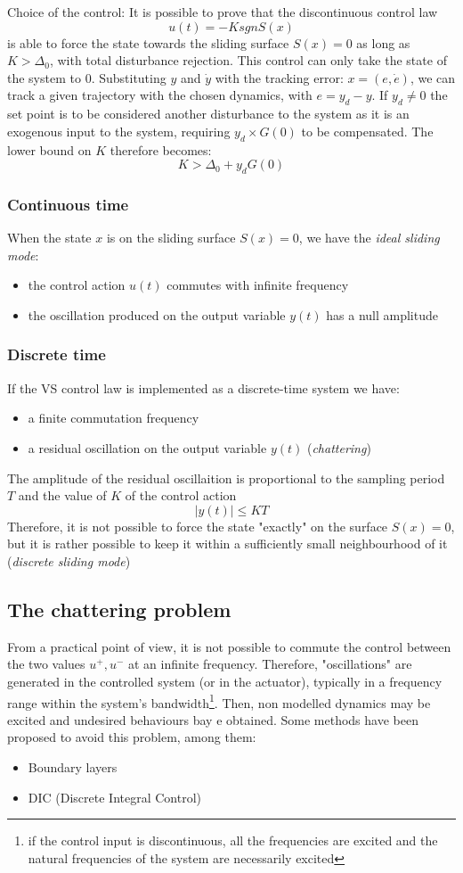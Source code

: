 \documentclass{book}
\begin{document}
Choice of the control: It is possible to prove that the discontinuous control law
\[
    u(t) = -K sgn S(x)
\]
is able to force the state towards the sliding surface $S(x)=0$ as long as $K>\Delta_0$, with total disturbance rejection. This control can only take the state of the system to 0. Substituting $y$ and $\dot{y}$ with the tracking error: $x=(e,\dot{e})$, we can track a given trajectory with the chosen dynamics, with $e=y_d-y$. If $y_d\neq 0 $ the set point is to be considered another disturbance to the system as it is an exogenous input to the system, requiring $y_d \times G(0)$ to be compensated. The lower bound on $K$ therefore becomes:
\[
    K>\Delta_0+y_dG(0)
\]

\subsubsection{Continuous time}
When the state $x$ is on the sliding surface $S(x)=0$, we have the \emph{ideal sliding mode}: 
\begin{itemize}
    \item the control action $u(t)$ commutes with infinite frequency
    \item the oscillation produced on the output variable $y(t)$ has a null amplitude
\end{itemize}
\subsubsection{Discrete time}
If the VS control law is implemented as a discrete-time system we have:
\begin{itemize}
    \item a finite commutation frequency
    \item a residual oscillation on the output variable $y(t)$ (\emph{chattering})
\end{itemize}
The amplitude of the residual oscillaition is proportional to the sampling period $T$ and the value of $K$ of the control action
\[
    |y(t)|\leq KT
\]
Therefore, it is not possible to force the state "exactly" on the surface $S(x)=0$, but it is rather possible to keep it within a sufficiently small neighbourhood of it (\emph{discrete sliding mode})
\subsection{The chattering problem}
From a practical point of view, it is not possible to commute the control between the two values $u^+,u^-$ at an infinite frequency. Therefore, "oscillations" are generated in the controlled system (or in the actuator), typically in a frequency range within the system's bandwidth\footnote{if the control input is discontinuous, all the frequencies are excited and the natural frequencies of the system are necessarily excited}. Then, non modelled dynamics may be excited and undesired behaviours bay e obtained. Some methods have been proposed to avoid this problem, among them:
\begin{itemize}
    \item Boundary layers
    \item DIC (Discrete Integral Control)
\end{itemize}
\end{document}
